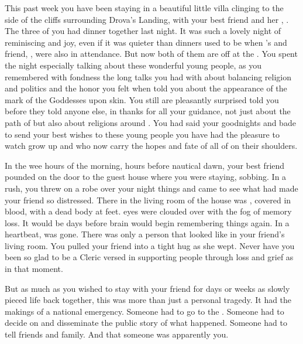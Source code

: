 \documentclass[char]{GL2020}
\begin{document}
This past week you have been staying in a beautiful little villa clinging to the side of the cliffs surrounding Drova’s Landing, with your best friend and her \cHeadDiplomat{\spouse}, \cHeadDiplomat{}. The three of you had dinner together last night. It was such a lovely night of reminiscing and joy, even if it was quieter than dinners used to be when \cHeadDiplomat{}’s \cPresident{\nibling} \cPresident{\full} and \cPresident{\their} friend, \cInitiate{\full}, were also in attendance. But now both of them are off at the \pSc{}. You spent the night especially talking about these wonderful young people, as you remembered with fondness the long talks you had with \cPresident{} about balancing religion and politics and the honor you felt when \cInitiate{} told you about the appearance of the mark of the Goddesses upon \cInitiate{\their} skin. You still are pleasantly surprised \cInitiate{} told you before they told anyone else, in thanks for all your guidance, not just about the path of \cEbb{} but also about religions around \pEarth{}. You had said your goodnights and bade \cHeadDiplomat{} to send your best wishes to these young people you have had the pleasure to watch grow up and who now carry the hopes and fate of all of \pEarth{} on their shoulders.

In the wee hours of the morning, hours before nautical dawn, your best friend pounded on the door to the guest house where you were staying, sobbing. In a rush, you threw on a robe over your night things and came to see what had made your friend so distressed. There in the living room of the house was \cHeadDiplomat{}, covered in blood, with a dead body at \cHeadDiplomat{\their} feet. \cHeadDiplomat{\Their} eyes were clouded over with the fog of memory loss. It would be days before \cHeadDiplomat{\their} brain would begin remembering things again. In a heartbeat, \cHeadDiplomat{} was gone. There was only a person that looked like \cHeadDiplomat{\them} in your friend’s living room. You pulled your friend into a tight hug as she wept. Never have you been so glad to be a Cleric versed in supporting people through loss and grief as in that moment. 

But as much as you wished to stay with your friend for days or weeks as \cHeadDiplomat{\they} slowly pieced \cHeadDiplomat{\their} life back together, this was more than just a personal tragedy. It had the makings of a national emergency. Someone had to go to the \pSchool{}. Someone had to decide on and disseminate the public story of what happened. Someone had to tell \cHeadDiplomat{\their} friends and family. And that someone was apparently you.
\end{document}
